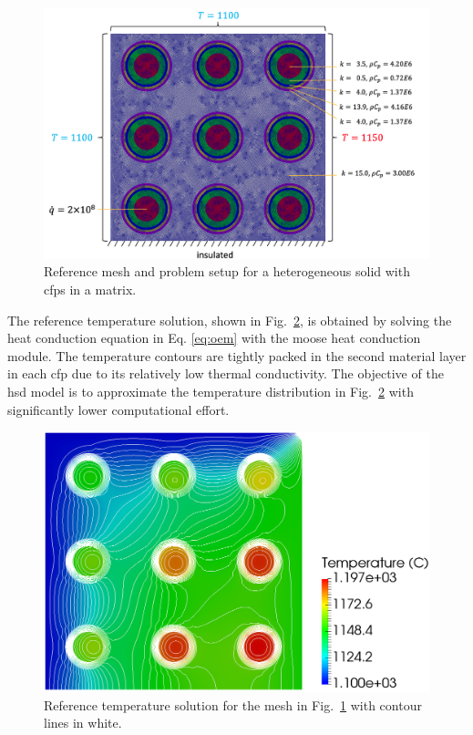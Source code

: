\begin{figure}[!h]
\centering
\hspace{1cm}
  \includegraphics[width=0.75\linewidth]{figs/multiscale_9_problem.png}
\caption{Reference mesh and problem setup for a heterogeneous solid with \glspl{cfp} in a matrix.}
\label{fig:nine_particle_mesha}
\end{figure}

The reference temperature solution, shown in Fig.\ \ref{fig:nine_particle_mesh}, is obtained by solving the heat conduction equation in Eq. \eqref{eq:oem} with the \gls{moose} heat conduction module. The temperature contours are tightly packed in the second material layer in each \gls{cfp} due to its relatively low thermal conductivity. The objective of the \gls{hsd} model is to approximate the temperature distribution in Fig.\ \ref{fig:nine_particle_mesh} with significantly lower computational effort.

\begin{figure}[!h]
  \centering
  \hspace{3.2cm}
  \includegraphics[width=0.63\linewidth]{figs/compact_9_reference.png}
\caption{Reference temperature solution for the mesh in Fig.\ \ref{fig:nine_particle_mesha} with contour lines in white.}
\label{fig:nine_particle_mesh}
\end{figure}


